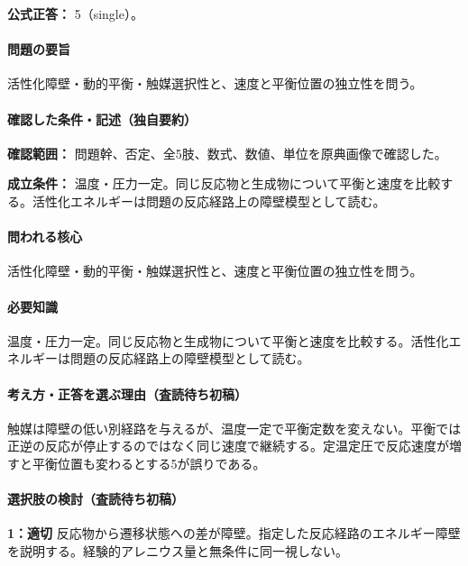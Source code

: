 \textbf{公式正答：} 5（single）。

\paragraph{問題の要旨} 活性化障壁・動的平衡・触媒選択性と、速度と平衡位置の独立性を問う。

\paragraph{確認した条件・記述（独自要約）}\mbox{}\par

\noindent\textbf{確認範囲：} 問題幹、否定、全5肢、数式、数値、単位を原典画像で確認した。\par

\noindent\textbf{成立条件：} 温度・圧力一定。同じ反応物と生成物について平衡と速度を比較する。活性化エネルギーは問題の反応経路上の障壁模型として読む。\par

\paragraph{問われる核心} 活性化障壁・動的平衡・触媒選択性と、速度と平衡位置の独立性を問う。

\paragraph{必要知識} 温度・圧力一定。同じ反応物と生成物について平衡と速度を比較する。活性化エネルギーは問題の反応経路上の障壁模型として読む。

\paragraph{考え方・正答を選ぶ理由（査読待ち初稿）} 触媒は障壁の低い別経路を与えるが、温度一定で平衡定数を変えない。平衡では正逆の反応が停止するのではなく同じ速度で継続する。定温定圧で反応速度が増すと平衡位置も変わるとする5が誤りである。

\paragraph{選択肢の検討（査読待ち初稿）}\mbox{}\par

\noindent\textbf{1：適切} 反応物から遷移状態への差が障壁。指定した反応経路のエネルギー障壁を説明する。経験的アレニウス量と無条件に同一視しない。\par

